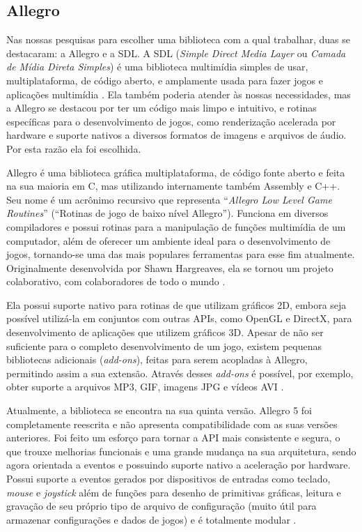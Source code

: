 \subsection{Allegro}
\label{allegro}
%
Nas nossas pesquisas para escolher uma biblioteca com a qual trabalhar, duas se destacaram: a Allegro e a SDL. A SDL (\textit{Simple Direct Media Layer} ou \textit{Camada de Mídia Direta Simples}) é uma biblioteca multimídia simples de usar, multiplataforma, de código aberto, e amplamente usada para fazer jogos e aplicações multimídia \cite{SDLDoc}. Ela também poderia atender às nossas necessidades, mas a Allegro se destacou por ter um código mais limpo e intuitivo, e rotinas específicas para o desenvolvimento de jogos, como renderização acelerada por hardware e suporte nativos a diversos formatos de imagens e arquivos de áudio. Por esta razão ela foi escolhida.
\par 
Allegro é uma biblioteca gráfica multiplataforma, de código fonte aberto e feita na sua maioria em C, mas utilizando internamente também Assembly e C++. Seu nome é um acrônimo recursivo que representa ``\textit{Allegro Low Level Game Routines}'' (``Rotinas de jogo de baixo nível Allegro''). Funciona em diversos compiladores e possui rotinas para a manipulação de funções multimídia de um computador, além de oferecer um ambiente ideal para o desenvolvimento de jogos, tornando-se uma das mais populares ferramentas para esse fim atualmente. Originalmente desenvolvida por Shawn Hargreaves, ela se tornou um projeto colaborativo, com colaboradores de todo o mundo \cite{AllegroDoc}.
\par
Ela possui suporte nativo para rotinas de que utilizam gráficos 2D, embora seja possível utilizá-la em conjuntos com outras APIs, como OpenGL e DirectX, para desenvolvimento de aplicações que utilizem gráficos 3D. Apesar de não ser suficiente para o completo desenvolvimento de um jogo, existem pequenas bibliotecas adicionais (\textit{add-ons}), feitas para serem acopladas à Allegro, permitindo assim a sua extensão. Através desses \textit{add-ons} é possível, por exemplo, obter suporte a arquivos MP3, GIF, imagens JPG e vídeos AVI \cite{AllegroDoc}. %
\par
Atualmente, a biblioteca se encontra na sua quinta versão. Allegro 5 foi completamente reescrita e não apresenta compatibilidade com as suas versões anteriores. Foi feito um esforço para tornar a API mais consistente e segura, o que trouxe melhorias funcionais e uma grande mudança na sua arquitetura, sendo agora orientada a eventos e possuindo suporte nativo a aceleração por hardware. Possui suporte a eventos gerados por dispositivos de entradas como teclado, \textit{mouse} e \textit{joystick} além de funções para desenho de primitivas gráficas, leitura e gravação de seu próprio tipo de arquivo de configuração (muito útil para armazenar configurações e dados de jogos) e é totalmente modular \cite{AllegroDoc}.
